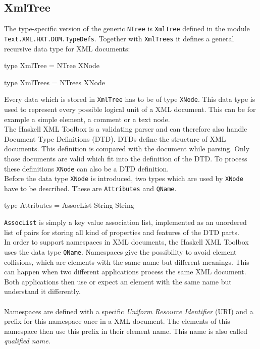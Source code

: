 \documentclass[11pt,a4paper,headsepline, bibtotoc]{scrreprt}
\begin{document}
\subsection{XmlTree}\label{xmltree}
The type-specific version of the generic {\tt NTree} is {\tt XmlTree} defined in the module {\tt Text\-.XML\-.HXT.DOM.TypeDefs}. Together with {\tt XmlTrees} it defines a general recursive data type for XML documents:
\clearpage
\begin{code}
type XmlTree = NTree XNode

type XmlTrees = NTrees XNode
\end{code}
Every data which is stored in {\tt XmlTree} has to be of type {\tt XNode}. This data type is used to represent every possible logical unit of a XML document. This can be for example a simple element, a comment or a text node.\\
The Haskell XML Toolbox is a validating parser and can therefore also handle Document Type Definitions (DTD). DTDs define the structure of XML documents. This definition is compared with the document while parsing. Only those documents are valid which fit into the definition of the DTD. To process these definitions {\tt XNode} can also be a DTD definition.\\
Before the data type {\tt XNode} is introduced, two types which are used by {\tt XNode} have to be described. These are {\tt Attributes} and {\tt QName}.
\begin{code}
type Attributes = AssocList String String
\end{code} 
{\tt AssocList} is simply a key value association list, implemented as an unordered list of pairs for storing all kind of properties and features of the DTD parts.\\
In order to support namespaces \cite{XML-NS} in XML documents, the Haskell XML Toolbox uses the data type {\tt QName}. Namespaces give the possibility to avoid element collisions, which are elements with the same name but different meanings. This can happen when two different applications process the same XML document. Both applications then use or expect an element with the same name but understand it differently.\\
\\
Namespaces are defined with a specific \textit{Uniform Resource Identifier} (URI) and a prefix for this namespace once in a XML document. The elements of this namespace then use this prefix in their element name. This name is also called \textit{qualified name}.\\
\end{document}
